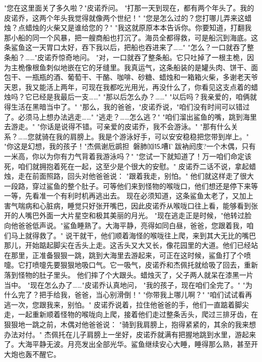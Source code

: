 \documentclass[12pt,UTF8]{ctexbook}
\begin{document}
"您在这里面关了多久啦？"皮诺乔问。
"打那一天到现在，都有两个年头了。我的皮诺乔，这两个年头我觉得就像两个世纪！"
"您是怎么过的？您打哪儿弄来这蜡烛？点蜡烛的火柴又是谁给您的？"
"我这就原原本本告诉你。你要知道，打翻我那小船的同一个风暴，把一艘商船也打沉了。海员全都得救，可是船沉到海底。这条鲨鱼这一天胃口太好，吞下我以后，把船也吞进来了……"
"怎么？一口就吞了整条船？……"皮诺乔惊奇地问。
"对，一口就吞了整条船。它只吐掉了一根主桅，因为主桅像根鱼刺似地嵌在它的牙缝里。我真运气，这条船装的是罐头肉、饼干、面包干、一瓶瓶的酒、葡萄干、干酪、咖啡、砂糖、蜡烛和一箱箱火柴，多谢老天爷天恩，我又能活上两年，可现在我都吃光用光，再没什么了，你看见这支点着的蜡烛吗？它已经是我最后一支……"
"那以后怎么办？……"
"以后吗？我亲爱的，咱俩就得生活在黑暗当中了。"
"那么，我的爸爸，"皮诺乔说，"咱们没有时间可以错过了。必须马上想办法逃走……"
"逃走？……怎么逃？"
"咱们溜出鲨鱼的嘴，跳到海里去游走。"
"你话是说得不错。可亲爱的皮诺乔，我不会游泳。"
"那有什么关系？……您就骑在我的肩膀上。我是个游泳好手，可以安安稳稳把您带到岸上。"
"你这是幻想，我的孩子！"杰佩谢卮鹚担∽磐肺⑽⒖嘈Γ跋衲阏庋?一个木偶，只有一米高，你以为你有力气背着我游泳吗？"
"您试一下就知道了！万一咱们命定该死，咱们就拥抱着死在一起，这至少是个很大的安慰。"
皮诺乔二话不说，拿起蜡烛，走在前面照路，回头对他爸爸说：
"跟着我走，别怕。"
他们就这样走了很大一段路，穿过鲨鱼的整个肚子。可等他们来到怪物的喉咙口，他们想还是停下来等一等，先看准一个有利时机再逃出去。
现在必须知道，这条鲨鱼太老了，又加上害气喘病和心脏病，睡觉只好张开嘴巴，因此皮诺乔从喉咙口往上看，能够看到张开的人嘴巴外面一大片星空和极其美丽的月光。
"现在逃走正是时候，"他转过脸向他爸爸低声说。"鲨鱼睡熟了。大海平静，亮得如同白昼，爸爸，您跟着我，咱们马上就得救了。"
说干就干，他们顺着海怪的喉咙往上爬，来到其大无比的嘴巴那儿，开始踮起脚尖在舌头上走。这舌头又大又长，像花园里的大道。他们已经站在那里，正准备狠狠一跳，跳到大海里去游起来，可正在这时候，鲨鱼打了个喷嚏。它打喷嚏先要狠狠地吸口气。它一吸气，皮诺乔和杰佩托就给吸了回去，重新落到怪物的肚子里头。
他们摔了个大跟头。蜡烛灭了，父子两人就呆在漆黑一片当中。
"现在怎么办了……"皮诺乔认真地问，
"我的孩子，现在咱们全完了。"
"为什么完了？把手给我，爸爸，当心别滑倒！"
"你带我上哪儿啊？"
"咱们试试看再逃一次，您跟我来，别怕。"
皮诺乔说着，拉住他爸爸的手，他们一直踮着脚尖走，一起重新顺着怪物的喉咙向上爬，接着他们走过整条舌头，爬过三排牙齿，在狠狠地一跳之前，木偶对他爸爸说：
"骑到我肩膀上，抱得紧紧的，其余的我来想办法对付。"
杰佩托在儿子肩膀上一坐好，皮诺乔就满有把握地跳到水里，游起来了。大海平静无波。月亮发出全部光华。鲨鱼继续安心大睡，睡得那么熟，甚至开大炮也轰不醒它。

\chapter{}
\end{document}
